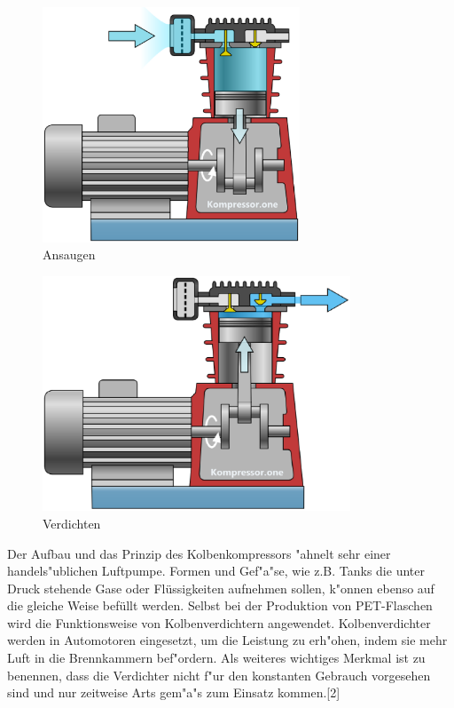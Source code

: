 \begin{figure}[!htb]
\begin{center}
\includegraphics[height=7cm]{bilder/Kom2.eps}
\end{center}
\caption{Ansaugen}\label{fig:komp2}
\end{figure}

\begin{figure}[!htb]
\begin{center}
\includegraphics[height=7cm]{bilder/kom3.eps}
\end{center}
\caption{Verdichten}\label{fig:komp3}
\end{figure}

Der Aufbau und das Prinzip des Kolbenkompressors "ahnelt 
sehr einer handels"ublichen Luftpumpe. 
Formen und Gef"a"se, wie z.B. Tanks die unter Druck stehende Gase oder 
Flüssigkeiten aufnehmen sollen, 
k"onnen ebenso auf die gleiche Weise befüllt werden. 
Selbst bei der Produktion von PET-Flaschen wird die Funktionsweise 
von Kolbenverdichtern angewendet. 
Kolbenverdichter werden in Automotoren eingesetzt,
 um die Leistung zu erh"ohen,
 indem sie mehr Luft in die Brennkammern bef"ordern. 
 Als weiteres wichtiges Merkmal ist zu benennen, 
 dass die Verdichter nicht f"ur den konstanten Gebrauch vorgesehen sind 
 und nur zeitweise Arts gem"a"s zum Einsatz kommen.[2] 
 
